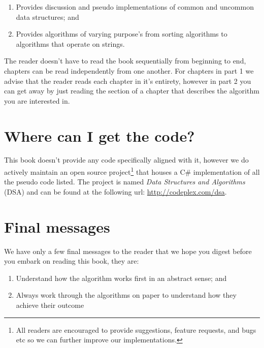 \begin{enumerate}
\item[Part 1:] Provides discussion and pseudo implementations of common and uncommon data structures; and
\item[Part 2:] Provides algorithms of varying purpose's from sorting algorithms to algorithms that operate on strings.
\end{enumerate}

The reader doesn't have to read the book sequentially from beginning to end, chapters can be read independently from one another. For chapters in part 1 we advise that the reader reads each chapter in it's entirety, however in part 2 you can get away by just reading the section of a chapter that describes the algorithm you are interested in.

\section{Where can I get the code?}
This book doesn't provide any code specifically aligned with it, however we do actively maintain an open source project\footnote{All readers are encouraged to provide suggestions, feature requests, and bugs etc so we can further improve our implementations.} that houses a C\# implementation of all the pseudo code listed. The project is named \textit{Data Structures and Algorithms} (DSA) and can be found at the following url: \url{http://codeplex.com/dsa}.

\section{Final messages}
We have only a few final messages to the reader that we hope you digest before you embark on reading this book, they are:

\begin{enumerate}
\item Understand how the algorithm works first in an abstract sense; and
\item Always work through the algorithms on paper to understand how they achieve their outcome
\end{enumerate}

